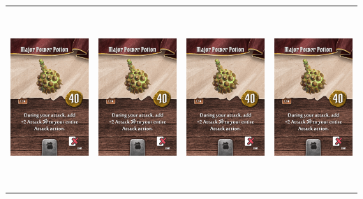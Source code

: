 \documentclass{minimal}
\begin{document}
{\begin{longtable}{llll}
\includegraphics[width=44mm,height=68mm]{./36-42/gh-041-major-power-potion.png} &
\includegraphics[width=44mm,height=68mm]{./36-42/gh-041-major-power-potion.png} &
\includegraphics[width=44mm,height=68mm]{./36-42/gh-041-major-power-potion.png} &
\includegraphics[width=44mm,height=68mm]{./36-42/gh-041-major-power-potion.png}\\ 

\end{longtable}}
\end{document}
